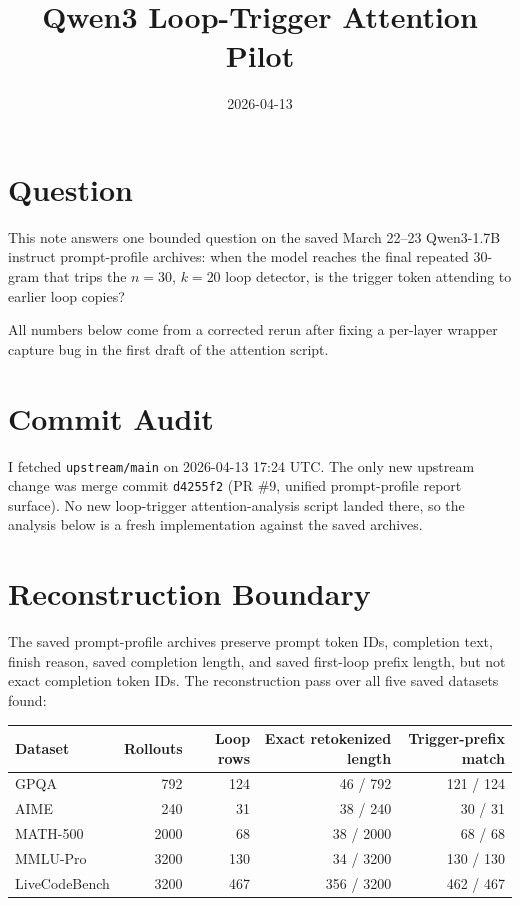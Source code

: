 \documentclass[11pt]{article}
\title{Qwen3 Loop-Trigger Attention Pilot}
\author{}
\date{2026-04-13}
\begin{document}
\maketitle

\section*{Question}

This note answers one bounded question on the saved March 22--23 Qwen3-1.7B instruct prompt-profile archives: when the model reaches the final repeated $30$-gram that trips the $n=30$, $k=20$ loop detector, is the trigger token attending to earlier loop copies?

All numbers below come from a corrected rerun after fixing a per-layer wrapper capture bug in the first draft of the attention script.

\section*{Commit Audit}

I fetched \texttt{upstream/main} on 2026-04-13 17:24 UTC. The only new upstream change was merge commit \texttt{d4255f2} (PR \#9, unified prompt-profile report surface). No new loop-trigger attention-analysis script landed there, so the analysis below is a fresh implementation against the saved archives.

\section*{Reconstruction Boundary}

The saved prompt-profile archives preserve prompt token IDs, completion text, finish reason, saved completion length, and saved first-loop prefix length, but not exact completion token IDs. The reconstruction pass over all five saved datasets found:

\begin{center}
\begin{tabular}{lrrrr}
\toprule
Dataset & Rollouts & Loop rows & Exact retokenized length & Trigger-prefix match \\
\midrule
GPQA & 792 & 124 & 46 / 792 & 121 / 124 \\
AIME & 240 & 31 & 38 / 240 & 30 / 31 \\
MATH-500 & 2000 & 68 & 38 / 2000 & 68 / 68 \\
MMLU-Pro & 3200 & 130 & 34 / 3200 & 130 / 130 \\
LiveCodeBench & 3200 & 467 & 356 / 3200 & 462 / 467 \\
\bottomrule
\end{tabular}
\end{center}
\end{document}
